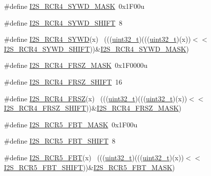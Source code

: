 \begin{DoxyCompactItemize}
\item 
\#define \hyperlink{group___i2_s___register___masks_ga1fb484ccadebeaab844b5dcfa0c89950}{I2\+S\+\_\+\+R\+C\+R4\+\_\+\+S\+Y\+W\+D\+\_\+\+M\+A\+SK}~0x1\+F00u
\item 
\#define \hyperlink{group___i2_s___register___masks_ga5ad9893dd40464452393719f845ae58d}{I2\+S\+\_\+\+R\+C\+R4\+\_\+\+S\+Y\+W\+D\+\_\+\+S\+H\+I\+FT}~8
\item 
\#define \hyperlink{group___i2_s___register___masks_gac521798b600f76c7a2348fbec411c28c}{I2\+S\+\_\+\+R\+C\+R4\+\_\+\+S\+Y\+WD}(x)                                              ~(((\hyperlink{_p_e___types_8h_a33594304e786b158f3fb30289278f5af}{uint32\+\_\+t})(((\hyperlink{_p_e___types_8h_a33594304e786b158f3fb30289278f5af}{uint32\+\_\+t})(x))$<$$<$\hyperlink{group___i2_s___register___masks_ga5ad9893dd40464452393719f845ae58d}{I2\+S\+\_\+\+R\+C\+R4\+\_\+\+S\+Y\+W\+D\+\_\+\+S\+H\+I\+FT}))\&\hyperlink{group___i2_s___register___masks_ga1fb484ccadebeaab844b5dcfa0c89950}{I2\+S\+\_\+\+R\+C\+R4\+\_\+\+S\+Y\+W\+D\+\_\+\+M\+A\+SK})
\item 
\#define \hyperlink{group___i2_s___register___masks_ga8eda652c5a5ee719963f7103561bdc73}{I2\+S\+\_\+\+R\+C\+R4\+\_\+\+F\+R\+S\+Z\+\_\+\+M\+A\+SK}~0x1\+F0000u
\item 
\#define \hyperlink{group___i2_s___register___masks_gaae89e490a3b7562ea1a9a2992a6a97a7}{I2\+S\+\_\+\+R\+C\+R4\+\_\+\+F\+R\+S\+Z\+\_\+\+S\+H\+I\+FT}~16
\item 
\#define \hyperlink{group___i2_s___register___masks_ga7a99bde0c58a42d3efabc8a1feba3725}{I2\+S\+\_\+\+R\+C\+R4\+\_\+\+F\+R\+SZ}(x)                                              ~(((\hyperlink{_p_e___types_8h_a33594304e786b158f3fb30289278f5af}{uint32\+\_\+t})(((\hyperlink{_p_e___types_8h_a33594304e786b158f3fb30289278f5af}{uint32\+\_\+t})(x))$<$$<$\hyperlink{group___i2_s___register___masks_gaae89e490a3b7562ea1a9a2992a6a97a7}{I2\+S\+\_\+\+R\+C\+R4\+\_\+\+F\+R\+S\+Z\+\_\+\+S\+H\+I\+FT}))\&\hyperlink{group___i2_s___register___masks_ga8eda652c5a5ee719963f7103561bdc73}{I2\+S\+\_\+\+R\+C\+R4\+\_\+\+F\+R\+S\+Z\+\_\+\+M\+A\+SK})
\item 
\#define \hyperlink{group___i2_s___register___masks_ga54847f1139b421f0f0df7af775a11996}{I2\+S\+\_\+\+R\+C\+R5\+\_\+\+F\+B\+T\+\_\+\+M\+A\+SK}~0x1\+F00u
\item 
\#define \hyperlink{group___i2_s___register___masks_gabe8f4784a8f4ce3235e31483d0b6e5f4}{I2\+S\+\_\+\+R\+C\+R5\+\_\+\+F\+B\+T\+\_\+\+S\+H\+I\+FT}~8
\item 
\#define \hyperlink{group___i2_s___register___masks_gaa69c444a625365478b4193b077baa686}{I2\+S\+\_\+\+R\+C\+R5\+\_\+\+F\+BT}(x)                                                ~(((\hyperlink{_p_e___types_8h_a33594304e786b158f3fb30289278f5af}{uint32\+\_\+t})(((\hyperlink{_p_e___types_8h_a33594304e786b158f3fb30289278f5af}{uint32\+\_\+t})(x))$<$$<$\hyperlink{group___i2_s___register___masks_gabe8f4784a8f4ce3235e31483d0b6e5f4}{I2\+S\+\_\+\+R\+C\+R5\+\_\+\+F\+B\+T\+\_\+\+S\+H\+I\+FT}))\&\hyperlink{group___i2_s___register___masks_ga54847f1139b421f0f0df7af775a11996}{I2\+S\+\_\+\+R\+C\+R5\+\_\+\+F\+B\+T\+\_\+\+M\+A\+SK})
$$
\end{DoxyCompactItemize}
